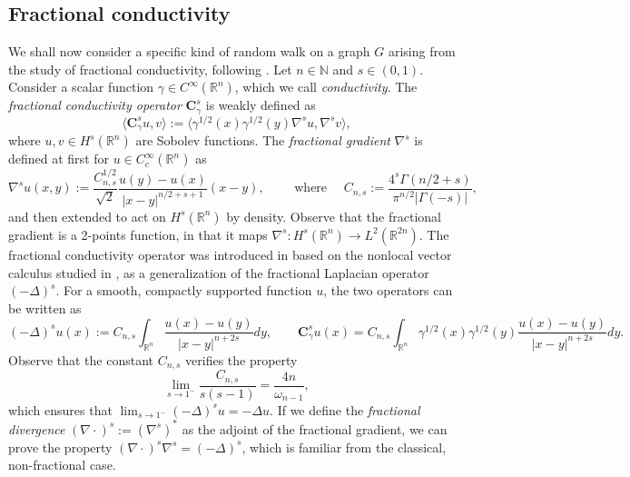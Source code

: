 \documentclass[a4paper,11pt,oneside]{amsart}
\newcommand{\R}{{\mathbb R}}
\newcommand{\N}{{\mathbb N}}
\begin{document}
\subsection{Fractional conductivity}
We shall now consider a specific kind of random walk on a graph $G$ arising from the study of fractional conductivity, following \cite{C20}. Let $n\in\N$ and $s\in(0,1)$. Consider a scalar function $\gamma\in C^\infty(\R^n)$, which we call \emph{conductivity}. The \emph{fractional conductivity operator} $\mathbf C^s_\gamma$ is weakly defined as
$$ \langle\mathbf C^s_\gamma u,v\rangle :=\langle \gamma^{1/2}(x)\gamma^{1/2}(y)\nabla^s u,\nabla^s v \rangle, $$
where $u,v\in H^s(\R^n)$ are Sobolev functions. The \emph{fractional gradient} $\nabla^s$ is defined at first for $u\in C^\infty_c(\R^n)$ as $$\nabla^su(x,y) := \frac{C_{n,s}^{1/2}}{\sqrt 2} \frac{u(y)-u(x)}{|x-y|^{n/2+s+1}}(x-y), \qquad\mbox{ where } \quad C_{n,s}:= \frac{4^s\Gamma(n/2+s)}{\pi^{n/2}|\Gamma(-s)|},$$
and then extended to act on $H^s(\R^n)$ by density. Observe that the fractional gradient is a 2-points function, in that it maps $\nabla^s : H^s(\mathbb R^n)\rightarrow L^2(\mathbb R^{2n})$. The fractional conductivity operator was introduced in \cite{C20} based on the nonlocal vector calculus studied in \cite{DGLZ12, DGLZ13}, as a generalization of the fractional Laplacian operator $(-\Delta)^s$. For a smooth, compactly supported function $u$, the two operators can be written as $$(-\Delta)^su(x):= C_{n,s}\int_{\R^n}\frac{u(x)-u(y)}{|x-y|^{n+2s}}dy, \qquad  \mathbf C^s_\gamma u(x) = C_{n,s}\int_{\R^n} \gamma^{1/2}(x)\gamma^{1/2}(y)\frac{u(x)-u(y)}{|x-y|^{n+2s}}dy.$$ Observe that the constant $C_{n,s}$ verifies the property $$ \lim_{s\rightarrow 1^-}\frac{C_{n,s}}{s(s-1)} = \frac{4n}{\omega_{n-1}},$$
which ensures that $\lim_{s\rightarrow 1^-}(-\Delta)^su = -\Delta u$. If we define the \emph{fractional divergence} $(\nabla\cdot)^s:=(\nabla^s)^*$ as the adjoint of the fractional gradient, we can prove the property $(\nabla\cdot)^s\nabla^s = (-\Delta)^s$, which is familiar from the classical, non-fractional case.
\end{document}
